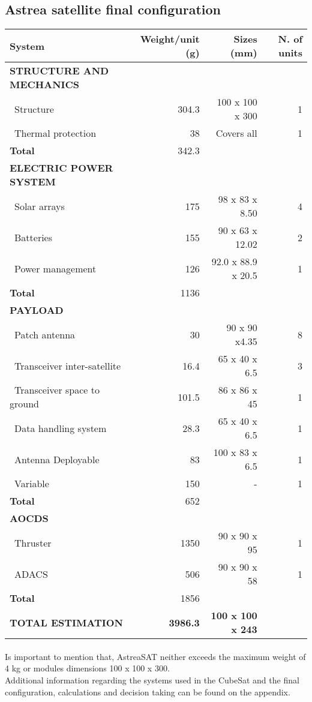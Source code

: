 \subsection{Astrea satellite final configuration}
\begin{longtable}{| l | r | r | r |}
	\hline
	\rowcolor[gray]{0.80}	\textbf{System}& \textbf{Weight/unit (g)} & \textbf{Sizes (mm)} & \textbf{N. of units}\\
	\hline
	\hline
	\endfirsthead
	
	
	\rowcolor[gray]{0.85} \textbf{STRUCTURE AND MECHANICS} & & & \\ \hline
	
	~Structure & 304.3 & 100 x 100 x 300& 1 \\
	~Thermal protection & 38 & Covers all & 1\\
	\hline 
	\rowcolor[gray]{0.95} \textbf{Total} & 342.3 & &  \\
	\hline 
	
	\rowcolor[gray]{0.85} \textbf{ELECTRIC POWER SYSTEM} & & & \\\hline
	
	~Solar arrays & 175 & 98 x 83 x 8.50 & 4 \\
	~Batteries & 155 & 90 x 63 x 12.02 & 2 \\
	~Power management & 126 & 92.0 x 88.9 x 20.5 & 1 \\
	\hline
	\rowcolor[gray]{0.95} \textbf{Total} & 1136 &  &  \\
	\hline \hline
	
	\rowcolor[gray]{0.85} \textbf{PAYLOAD} & & & \\ \hline
	
	~Patch antenna & 30 & 90 x 90 x4.35& 8 \\
	~Transceiver inter-satellite & 16.4 & 65 x 40 x 6.5 & 3 \\
	~Transceiver space to ground & 101.5 & 86 x 86 x 45 & 1 \\
	~Data handling system & 28.3 & 65 x 40 x 6.5 & 1\\
	~Antenna Deployable & 83 & 100 x 83 x 6.5 &1\\
	~Variable & 150 & - & 1\\
	\hline
	\rowcolor[gray]{0.95} \textbf{Total} & 652 &  & \\
	\hline \hline
	
	\rowcolor[gray]{0.85} \textbf{AOCDS} & & &\\ \hline
	
	~Thruster & 1350 & 90 x 90 x 95 & 1 \\
	~ADACS & 506 & 90 x 90 x 58 & 1 \\
	\hline
	\rowcolor[gray]{0.95} \textbf{Total} & 1856 &  & \\
	\hline
	
	\rowcolor[gray]{0.9} \textbf{TOTAL ESTIMATION} & \textbf{3986.3} &\textbf{100 x 100 x 243} & \\ \hline
\end{longtable} 
\paragraph{}Is important to mention that, AstreaSAT neither exceeds the maximum weight of 4 kg or modules dimensions 100 x 100 x 300.\\

Additional information regarding the systems used in the CubeSat and the final configuration, calculations and decision taking can be found on the appendix.